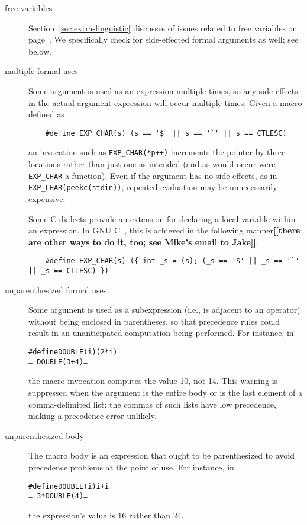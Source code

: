 \documentclass[10pt]{article}
\newcommand{\comment}[1]{\textbf{[[#1]]}}
\begin{document}
\begin{description}
\item[free variables]
  Section~\ref{sec:extra-linguistic} discusses of issues related to free
  variables on page~\pageref{page:freevar}.  We specifically check for
  side-effected formal arguments as well; see below.

\item[multiple formal uses]
  Some argument is used as an expression multiple times, so any side
  effects in the actual argument expression will occur multiple times.
  Given a macro defined as
\begin{verbatim}
    #define EXP_CHAR(s) (s == '$' || s == '`' || s == CTLESC)
\end{verbatim}
  an invocation such as {\tt \verb|EXP_CHAR|(*p++)} increments the pointer
  by three locations rather than just one as intended (and as would occur
  were \verb|EXP_CHAR| a function).  Even if the argument has no side
  effects, as in {\tt \verb|EXP_CHAR|(peekc(stdin))}, repeated evaluation may be
  unnecessarily expensive.
        
  Some C dialects provide an extension for declaring a local variable
  within an expression.  In GNU C~\cite{GCC}, this is achieved in the
  following manner\comment{there are other ways to do it, too; see Mike's email
  to Jake}:
\begin{verbatim}
    #define EXP_CHAR(s) ({ int _s = (s); (_s == '$' || _s == '`' || _s == CTLESC) })
\end{verbatim}

\item[unparenthesized formal uses]
        Some argument is used as a subexpression (i.e., is adjacent to an
        operator) without being enclosed in parentheses, so that precedence
        rules could result in an unanticipated computation being performed.
        For instance, in
\begin{alltt}
    #define DOUBLE(i) (2*i)
    \ldots\ DOUBLE(3+4) \ldots
\end{alltt}
        the macro invocation computes the value 10, not 14.
        This warning is suppressed when the argument is the entire body
        or is the last element of a comma-delimited list:  the commas of
        such lists have low precedence, making a precedence error unlikely.

\item[unparenthesized body]
        The macro body is an expression that ought to be parenthesized to
        avoid precedence problems at the point of use.  For instance, in
\begin{alltt}
    #define DOUBLE(i) i+i
    \ldots\ 3*DOUBLE(4) \ldots
\end{alltt}
        the expression's value is 16 rather than 24.
        

\end{description}
\end{document}
